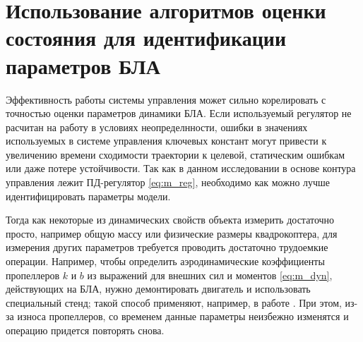 \section{Использование алгоритмов оценки состояния для идентификации параметров БЛА}

Эффективность работы системы управления может сильно корелировать с точностью оценки параметров динамики БЛА.
Если используемый регулятор не расчитан на работу в условиях неопределнности, ошибки в значениях используемых в системе управления ключевых констант могут привести к увеличению времени сходимости траектории к целевой, статическим ошибкам или даже потере устойчивости.
Так как в данном исследовании в основе контура управления лежит ПД-регулятор \ref{eq:m_reg}, необходимо как можно лучше идентифицировать параметры модели. 

Тогда как некоторые из динамических свойств объекта измерить достаточно просто, например общую массу или физические размеры квадрокоптера, для измерения других параметров требуется проводить достаточно трудоемкие операции.
Например, чтобы определить аэродинамические коэффициенты пропеллеров
$k$ и $b$
из выражений для внешних сил и моментов \ref{eq:m_dyn}, действующих на БЛА,
нужно демонтировать двигатель и использовать специальный стенд; такой способ применяют, например, в работе \cite{Ryll01}. При этом, из-за износа пропеллеров, со временем данные параметры неизбежно изменятся и операцию придется повторять снова.

